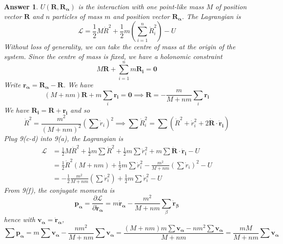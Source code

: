 \documentclass[a4paper]{article}
\newtheorem{ans}{Answer}[section]
\theoremstyle{new}
\begin{document}
\begin{ans}
$U(\mathbf{R},\mathbf{R_\alpha})$ is the interaction with one point-like mass $M$ of position vector $\mathbf{R}$ and $n$ particles of mass $m$ and position vector $\mathbf{R_\alpha}$. The Lagrangian is
\begin{equation}
\mathcal{L}=\frac{1}{2}M\dot{R}^2+\frac{1}{2}m(\sum_{i=1}^n\dot{R}_i^2)-U\tag{9a}
\end{equation}
Without loss of generality, we can take the centre of mass at the origin of the system. Since the centre of mass is fixed, we have a holonomic constraint
\begin{equation}
M\mathbf{R}+\sum_{i=1}^nm\mathbf{R_i}=\boldsymbol{0}\tag{9b}
\end{equation}
Write $\mathbf{r_\alpha}=\mathbf{R_\alpha}-\mathbf{R}$. We have
\begin{equation}
(M+nm)\mathbf{R}+m\sum_i\mathbf{r_i}=\boldsymbol{0}\implies\mathbf{R}=-\frac{m}{M+nm}\sum_i\mathbf{r_i}\tag{9c}
\end{equation}
We have $\mathbf{R_i}=\mathbf{R}+\mathbf{r_i}$ and so
\begin{equation}
\dot{R}^2=\frac{m^2}{(M+nm)^2}(\sum\dot{r}_i)^2\implies\sum\dot{R}_i^2=\sum(\dot{R}^2+\dot{r}_i^2+2\mathbf{\dot{R}}\cdot\mathbf{\dot{r}_i})\tag{9d,e}
\end{equation}
Plug 9(c-d) into 9(a), the Lagrangian is 
\begin{align}
\mathcal{L}&=\frac{1}{2}M\dot{R}^2+\frac{1}{2}m\sum\dot{R}^2+\frac{1}{2}m\sum\dot{r}_i^2+m\sum\mathbf{\dot{R}}\cdot\mathbf{\dot{r}_i}-U\nonumber\\&=\frac{1}{2}\dot{R}^2(M+nm)+\frac{1}{2}m\sum\dot{r}_i^2-\frac{m^2}{M+nm}(\sum\dot{r}_i)^2-U\nonumber\\&=-\frac{1}{2}\frac{m^2}{M+nm}(\sum\dot{r}_i^2)+\frac{1}{2}m\sum\dot{r}_i^2-U\tag{9f}
\end{align}
From 9(f), the conjugate momenta is
\begin{equation}
\mathbf{p_\alpha}=\frac{\partial\mathcal{L}}{\partial\mathbf{\dot{r}_\alpha}}=m\mathbf{\dot{r}_\alpha}-\frac{m^2}{M+nm}\sum_\beta\mathbf{\dot{r}_\beta}\tag{9g}
\end{equation}
hence with $\mathbf{v_\alpha}=\mathbf{\dot{r}_\alpha}$,
\begin{equation}
\sum\mathbf{p_\alpha}=m\sum\mathbf{v_\alpha}-\frac{nm^2}{M+nm}\sum\mathbf{v_\alpha}=\frac{(M+nm)m\sum\mathbf{v_\alpha}-nm^2\sum\mathbf{v_\alpha}}{M+nm}=\frac{mM}{M+nm}\sum\mathbf{v_\alpha}\tag{9h}
\end{equation}

\end{ans}
\end{document}

